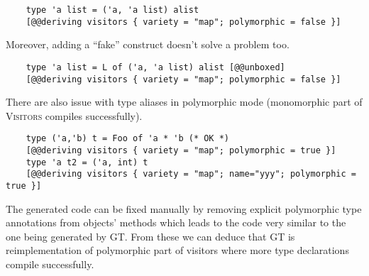 \begin{itemize}
\begin{lstlisting}
    type 'a list = ('a, 'a list) alist
    [@@deriving visitors { variety = "map"; polymorphic = false }]
    \end{lstlisting}
    Moreover, adding a ``fake'' construct doesn't solve a problem too.
    \begin{lstlisting}
    type 'a list = L of ('a, 'a list) alist [@@unboxed]
    [@@deriving visitors { variety = "map"; polymorphic = false }]
    \end{lstlisting}
    There are also issue with type aliases in polymorphic mode (monomorphic part of \textsc{Visitors} compiles successfully).
    \begin{lstlisting}
    type ('a,'b) t = Foo of 'a * 'b (* OK *)
    [@@deriving visitors { variety = "map"; polymorphic = true }]
    type 'a t2 = ('a, int) t
    [@@deriving visitors { variety = "map"; name="yyy"; polymorphic = true }]
    \end{lstlisting}
    The generated code can be fixed manually by removing explicit polymorphic type annotations from objects' methods which leads to the code very similar to the one being generated by GT. From these we can deduce that GT is reimplementation of polymorphic part of visitors where more type declarations compile successfully.
\end{itemize}
